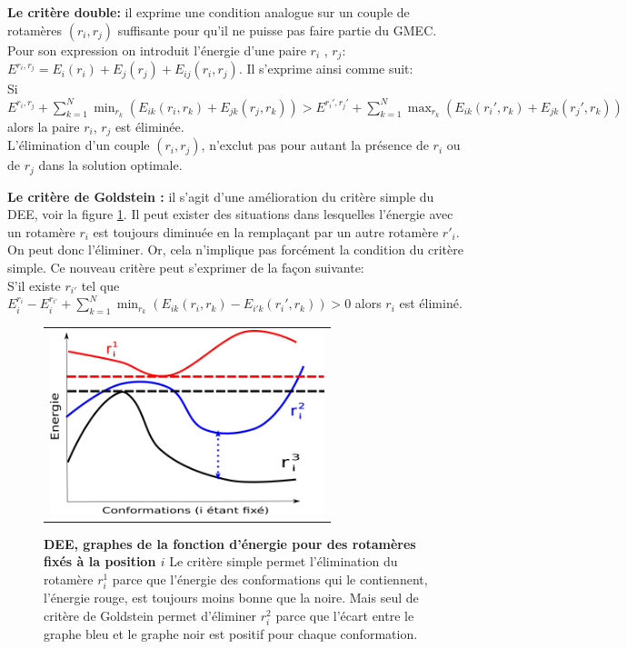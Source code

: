 \textbf{Le critère double:} il exprime une condition analogue sur un couple de rotamères $(r_i,r_j)$ suffisante pour qu'il ne puisse pas faire partie du GMEC. Pour son expression on introduit l'énergie d'une paire $r_i$ , $r_j$: $E^{r_i,r_j} = E_i(r_i) + E_j(r_j) + E_{ij}(r_i,r_j)$. Il s'exprime ainsi comme suit:\\
Si\\
$\displaystyle E^{r_i,r_j} + \sum_{k=1}^N \min_{r_k} (E_{ik}(r_i,r_k) + E_{jk}(r_j,r_k)) >  E^{r_i',r_j'} + \sum_{k=1}^N \max_{r_k} (E_{ik}(r_i',r_k) + E_{jk}(r_j',r_k))$ \\
alors la paire $r_i$, $r_j$ est éliminée.\\
L'élimination d'un couple $(r_i,r_j)$, n'exclut pas pour autant la présence de $r_i$ ou de $r_j$ dans la solution optimale. 

\textbf{Le critère de Goldstein \cite{Goldstein94}:} il s'agit d'une amélioration du critère simple du DEE, voir la figure \ref{fig:DEE}. Il peut exister des situations dans lesquelles l'énergie avec un rotamère $r_i$  est toujours diminuée en la remplaçant par un autre rotamère $r'_i$. On peut donc l'éliminer. Or, cela n'implique pas forcément la condition du critère simple. Ce nouveau critère peut s'exprimer de la façon suivante:\\
S'il existe $r_{i'}$ tel que $\displaystyle E_i^{r_i} - E_i^{r_{i'}}+ \sum_{k=1}^N \min_{r_k} (E_{ik}(r_i,r_k) - E_{i'k}(r_i',r_k)) > 0$ alors $r_i$ est éliminé.

   \begin{figure}[!htbp]
     \centering
     \begin{tabular}{c}
       \includegraphics[width=8cm]{figure/DEE.png} &
     \end{tabular}
     
     \caption{\textbf{DEE, graphes de la fonction d'énergie pour des rotamères fixés à la position $i$} Le critère simple permet l'élimination du rotamère $r^1_i$ parce que l'énergie des conformations qui le contiennent, l'énergie rouge, est toujours moins bonne que la noire. Mais seul de critère de Goldstein permet d'éliminer $r^2_i$ parce que l'écart entre le graphe bleu et le graphe noir est positif pour chaque conformation.}
\label{fig:DEE}
   \end{figure}

